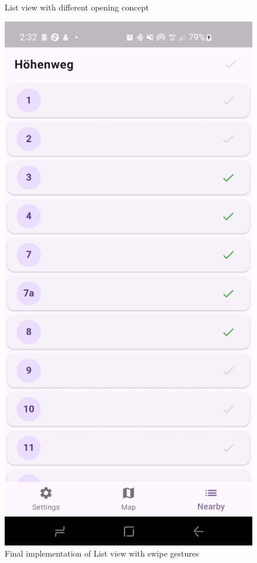 \begin{figure}[H]
\begin{minipage}{0.3\textwidth}
        \caption{List view with different opening concept}
    \end{minipage}
    \hspace{0.3cm}
    \begin{minipage}{0.3\textwidth}
        \centering
        \includegraphics[width=\textwidth]{images/paul/wireframes/finalList.jpeg}
        \caption{Final implementation of List view with swipe gestures}
    \end{minipage}
\end{figure}

